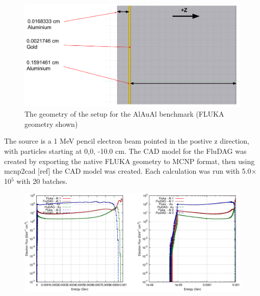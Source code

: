 \begin{figure}[ht!]
 \begin{centering}
 \centering
 \includegraphics[width=0.7\paperwidth]{../figs/alaual_geom.png}
 \caption{The geometry of the setup for the AlAuAl benchmark (FLUKA geometry shown)}
 \label{fig:alaual_fig}
 \end{centering}
\end{figure}

The source is a 1 MeV pencil electron beam pointed in the postive z direction, with particles starting at 0,0, -10.0 cm. The CAD model
for the FluDAG was created by exporting the native FLUKA geometry to MCNP format, then using mcnp2cad [ref] the CAD model was created. 
Each calculation was run with 5.0$\times$10$^5$ with 20 batches.

\begin{figure}[ht!]
 \begin{centering}
 \centering
 \includegraphics[width=0.7\paperwidth]{../figs/alaual_spectra_lin_log.png}
 \caption{}
 \label{fig:alaual_spectra_linlog}
 \end{centering}
\end{figure}

